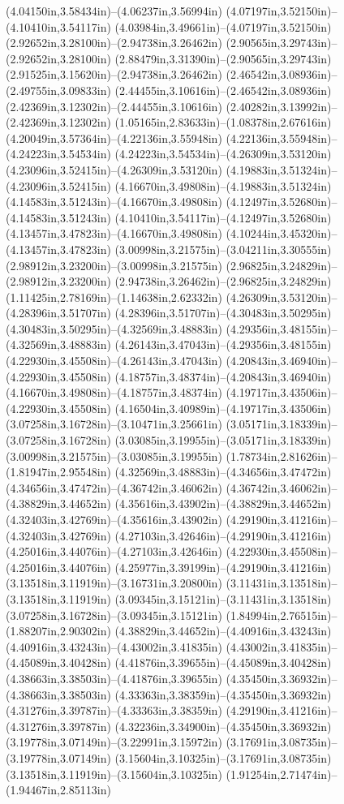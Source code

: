 (4.04150in,3.58434in)--(4.06237in,3.56994in) (4.07197in,3.52150in)--(4.10410in,3.54117in) (4.03984in,3.49661in)--(4.07197in,3.52150in) (2.92652in,3.28100in)--(2.94738in,3.26462in) (2.90565in,3.29743in)--(2.92652in,3.28100in) (2.88479in,3.31390in)--(2.90565in,3.29743in) (2.91525in,3.15620in)--(2.94738in,3.26462in) (2.46542in,3.08936in)--(2.49755in,3.09833in) (2.44455in,3.10616in)--(2.46542in,3.08936in) (2.42369in,3.12302in)--(2.44455in,3.10616in) (2.40282in,3.13992in)--(2.42369in,3.12302in) (1.05165in,2.83633in)--(1.08378in,2.67616in) (4.20049in,3.57364in)--(4.22136in,3.55948in) (4.22136in,3.55948in)--(4.24223in,3.54534in) (4.24223in,3.54534in)--(4.26309in,3.53120in) (4.23096in,3.52415in)--(4.26309in,3.53120in) (4.19883in,3.51324in)--(4.23096in,3.52415in) (4.16670in,3.49808in)--(4.19883in,3.51324in) (4.14583in,3.51243in)--(4.16670in,3.49808in) (4.12497in,3.52680in)--(4.14583in,3.51243in) (4.10410in,3.54117in)--(4.12497in,3.52680in) (4.13457in,3.47823in)--(4.16670in,3.49808in) (4.10244in,3.45320in)--(4.13457in,3.47823in) (3.00998in,3.21575in)--(3.04211in,3.30555in) (2.98912in,3.23200in)--(3.00998in,3.21575in) (2.96825in,3.24829in)--(2.98912in,3.23200in) (2.94738in,3.26462in)--(2.96825in,3.24829in) (1.11425in,2.78169in)--(1.14638in,2.62332in) (4.26309in,3.53120in)--(4.28396in,3.51707in) (4.28396in,3.51707in)--(4.30483in,3.50295in) (4.30483in,3.50295in)--(4.32569in,3.48883in) (4.29356in,3.48155in)--(4.32569in,3.48883in) (4.26143in,3.47043in)--(4.29356in,3.48155in) (4.22930in,3.45508in)--(4.26143in,3.47043in) (4.20843in,3.46940in)--(4.22930in,3.45508in) (4.18757in,3.48374in)--(4.20843in,3.46940in) (4.16670in,3.49808in)--(4.18757in,3.48374in) (4.19717in,3.43506in)--(4.22930in,3.45508in) (4.16504in,3.40989in)--(4.19717in,3.43506in) (3.07258in,3.16728in)--(3.10471in,3.25661in) (3.05171in,3.18339in)--(3.07258in,3.16728in) (3.03085in,3.19955in)--(3.05171in,3.18339in) (3.00998in,3.21575in)--(3.03085in,3.19955in) (1.78734in,2.81626in)--(1.81947in,2.95548in) (4.32569in,3.48883in)--(4.34656in,3.47472in) (4.34656in,3.47472in)--(4.36742in,3.46062in) (4.36742in,3.46062in)--(4.38829in,3.44652in) (4.35616in,3.43902in)--(4.38829in,3.44652in) (4.32403in,3.42769in)--(4.35616in,3.43902in) (4.29190in,3.41216in)--(4.32403in,3.42769in) (4.27103in,3.42646in)--(4.29190in,3.41216in) (4.25016in,3.44076in)--(4.27103in,3.42646in) (4.22930in,3.45508in)--(4.25016in,3.44076in) (4.25977in,3.39199in)--(4.29190in,3.41216in) (3.13518in,3.11919in)--(3.16731in,3.20800in) (3.11431in,3.13518in)--(3.13518in,3.11919in) (3.09345in,3.15121in)--(3.11431in,3.13518in) (3.07258in,3.16728in)--(3.09345in,3.15121in) (1.84994in,2.76515in)--(1.88207in,2.90302in) (4.38829in,3.44652in)--(4.40916in,3.43243in) (4.40916in,3.43243in)--(4.43002in,3.41835in) (4.43002in,3.41835in)--(4.45089in,3.40428in) (4.41876in,3.39655in)--(4.45089in,3.40428in) (4.38663in,3.38503in)--(4.41876in,3.39655in) (4.35450in,3.36932in)--(4.38663in,3.38503in) (4.33363in,3.38359in)--(4.35450in,3.36932in) (4.31276in,3.39787in)--(4.33363in,3.38359in) (4.29190in,3.41216in)--(4.31276in,3.39787in) (4.32236in,3.34900in)--(4.35450in,3.36932in) (3.19778in,3.07149in)--(3.22991in,3.15972in) (3.17691in,3.08735in)--(3.19778in,3.07149in) (3.15604in,3.10325in)--(3.17691in,3.08735in) (3.13518in,3.11919in)--(3.15604in,3.10325in) (1.91254in,2.71474in)--(1.94467in,2.85113in) 